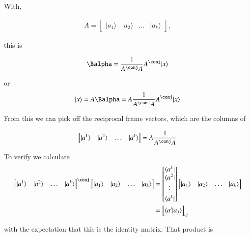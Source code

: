 \documentclass{article}
\newcommand{\ket}[1]{\lvert {#1} \rangle}
\newcommand{\bra}[1]{\langle {#1} \rvert}
\newcommand{\braket}[2]{\langle{#1} \vert {#2}\rangle}
\begin{document}
With,

\begin{align*}
A = 
\begin{bmatrix}
\ket{a_1} & \ket{a_2} & \hdots & \ket{a_k}
\end{bmatrix},
\end{align*}

this is

\begin{align*}
\Balpha = \inv{A^\conj A} A^\conj \ket{x}
\end{align*}

or 
\begin{align*}
\ket{x} = A \Balpha = A \inv{A^\conj A} A^\conj \ket{x}
\end{align*}

From this we can pick off the reciprocal frame vectors, which are the columns of 

\begin{align*}
\begin{bmatrix}
\ket{a^1} & \ket{a^2} & \hdots & \ket{a^k}
\end{bmatrix} = 
A \inv{A^\conj A}
\end{align*}

To verify we calculate 
\begin{align*}
{\begin{bmatrix}
\ket{a^1} & \ket{a^2} & \hdots & \ket{a^k}
\end{bmatrix}}^\conj
\begin{bmatrix}
\ket{a_1} & \ket{a_2} & \hdots & \ket{a_k}
\end{bmatrix}
&=
\begin{bmatrix}
\bra{a^1} \\ \bra{a^2} \\ \vdots \\ \bra{a^k}
\end{bmatrix}
\begin{bmatrix}
\ket{a_1} & \ket{a_2} & \hdots & \ket{a_k}
\end{bmatrix} \\
&= 
{
\begin{bmatrix}
\braket{a^i}{a_j}
\end{bmatrix}}_{ij}
\end{align*}

with the expectation that this is the identity matrix.  That product is
\end{document}
